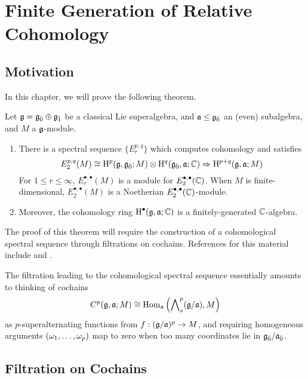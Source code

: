 \chapter{Finite Generation of Relative Cohomology}
\label{ch:finite-generation}


\section{Motivation}

In this chapter, we will prove the following theorem.

\begin{theorem}
  \label{thm:fg}
  Let $\mathfrak{g} = {\mathfrak{g}}_{\bar{0}} \oplus {\mathfrak{g}}_{\bar{1}}$ be a classical Lie superalgebra, and $\mathfrak{a} \leq {\mathfrak{g}}_{\bar{0}}$ an (even) subalgebra, and $M$ a $\mathfrak{g}$-module.
  \begin{enumerate}[\indent\rm (a)]
    \item There is a spectral sequence $\{E_r^{p,q}\}$ which computes cohomology and satisfies
  \[
    E_2^{p,q}(M) \cong \operatorname{H}^p(\mathfrak{g},{\mathfrak{g}}_{\bar{0}};M) \otimes \operatorname{H}^q({\mathfrak{g}}_{\bar{0}},\mathfrak{a};\mathbb{C}) \Rightarrow \operatorname{H}^{p+q}(\mathfrak{g},\mathfrak{a};M)
  \]
  For $1 \leq r \leq \infty$, $E_r^{\bullet,\bullet}(M)$ is a module for $E_2^{\bullet,\bullet}(\mathbb{C})$. When $M$ is finite-dimensional, $E_2^{\bullet,\bullet}(M)$ is a Noetherian $E_2^{\bullet,\bullet}(\mathbb{C})$-module.
    \item Moreover, the cohomology ring $\operatorname{H}^\bullet(\mathfrak{g},\mathfrak{a};\mathbb{C})$ is a finitely-generated $\mathbb{C}$-algebra.
  \end{enumerate}
\end{theorem}

The proof of this theorem will require the construction of a cohomological spectral sequence through filtrations on cochains. References for this material include \cite[\S 3]{MR1634407} and \cite[\S 5]{MR1269324}.

The filtration leading to the cohomological spectral sequence essentially amounts to thinking of cochains
\[
  C^p(\mathfrak{g},\mathfrak{a};M) \cong \operatorname{Hom}_{\mathfrak{a}}\left(\bigwedge\nolimits^{p}_s(\mathfrak{g}/\mathfrak{a}),M\right)
\]
as $p$-superalternating functions from $f:(\mathfrak{g}/\mathfrak{a})^{ p} \to M$, and requiring homogeneous arguments $(\omega_1,\ldots, \omega_p)$ map to zero when too many coordinates lie in ${\mathfrak{g}}_{\bar{0}}/{\mathfrak{a}}_{\bar{0}}$.

\section{Filtration on Cochains}
\label{sec:filt-cochains}

